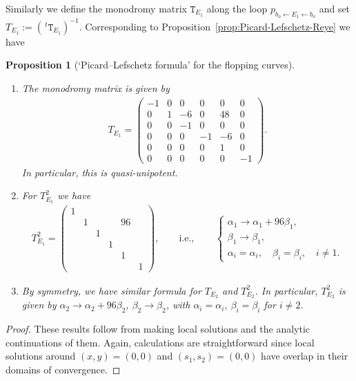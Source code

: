 \documentclass[10pt,a4paper]{amsart}
\numberwithin{equation}{section}
\newtheorem{Proposition}[Theorem]{Proposition}
\begin{document}
Similarly we define the monodromy matrix $\mathtt{T}_{E_{1}}$ along the loop $p_{b_{o}\leftarrow E_{1}\leftarrow b_{o}}$ and set $T_{E_{1}}:=(\,^{t}\mathtt{T}_{E_{1}})^{-1}$. Corresponding to Proposition~\ref{prop:Picard-Lefschetz-Reye} we have
\begin{Proposition}[`Picard--Lefschetz formula' for the flopping curves] \label{prop:Picard--Lefschetz-P3P3}
\quad \begin{enumerate}\itemsep=0pt
\item[{\rm (1)}] The monodromy matrix is given by
\begin{gather*}
T_{E_{1}}=\left(\begin{smallmatrix}-1 & 0 & 0 & 0 & 0 & 0\\
0 & 1 & -6 & 0 & 48 & 0\\
0 & 0 & -1 & 0 & 0 & 0\\
0 & 0 & 0 & -1 & -6 & 0\\
0 & 0 & 0 & 0 & 1 & 0\\
0 & 0 & 0 & 0 & 0 & -1
\end{smallmatrix}\right).
\end{gather*}
In particular, this is quasi-unipotent.

\item[{\rm (2)}] For $T_{E_{1}}^{2}$ we have
\begin{gather*}
T_{E_{1}}^{2}=\left(\begin{smallmatrix}1\\
 & 1 & & & 96\\
 & & 1\\
 & & & 1\\
 & & & & 1\\
 & & & & & 1
\end{smallmatrix}\right),\qquad \text{i.e.},\qquad \begin{cases}
\alpha_{1}\to\alpha_{1}+96\beta_{1},\\
\beta_{1}\to\beta_{1},\\
\alpha_{i}=\alpha_{i}, \quad \beta_{i}=\beta_{i}, \quad i\not=1.
\end{cases}
\end{gather*}

\item[{\rm (3)}] By symmetry, we have similar formula for $T_{E_{2}}$ and $T_{E_{2}}^{2}$. In particular, $T_{E_{2}}^{2}$ is given by
$\alpha_{2}\to\alpha_{2}+96\beta_{2}$, $\beta_{2}\to\beta_{2}$, with $\alpha_{i}=\alpha_{i}$, $\beta_{i}=\beta_{i}$ for $i\not=2$.

\end{enumerate}\end{Proposition}
\begin{proof}These results follow from making local solutions and the analytic continuations of them. Again, calculations are straightforward since local solutions around $(x,y)=(0,0)$ and $(s_{1},s_{2})=(0,0)$ have overlap in their domains of convergence. \end{proof}
\end{document}
